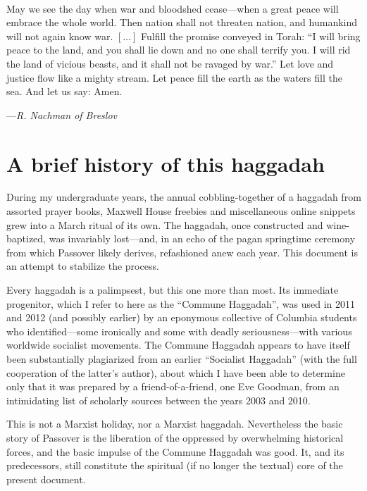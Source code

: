 \documentclass[a4paper,10pt,openany]{memoir}
\newcommand{\HgEllipsis}{\ensuremath{\left[\ldots\right]}}
\newcommand{\HgSource}[1]{\hfill{\small---\itshape{#1}}}
\newenvironment{HgEnglish}{\strut\\\noindent}{\vspace{1em}}
\begin{document}
\vfill

\begin{HgEnglish}
May we see the day when war and bloodshed cease---when a great peace will
embrace the whole world.  Then nation shall not threaten nation, and humankind
will not again know war. \HgEllipsis{}
Fulfill the promise conveyed in Torah: ``I will bring peace to the
land, and you shall lie down and no one shall terrify you.  I will rid the land
of vicious beasts, and it shall not be ravaged by war.'' Let love and justice
flow like a mighty stream.  Let peace fill the earth as the waters fill the sea.
And let us say: Amen. 

\HgSource{R. Nachman of Breslov}
\end{HgEnglish}

\vfill

\chapter*{A brief history of this haggadah}

During my undergraduate years, the annual cobbling-together of a haggadah from
assorted prayer books, Maxwell House freebies and miscellaneous online snippets
grew into a March ritual of its own. The haggadah, once constructed and
wine-baptized, was invariably lost---and, in an echo of the pagan springtime
ceremony from which Passover likely derives, refashioned anew each year.  This
document is an attempt to stabilize the process.

Every haggadah is a palimpsest, but this one more than most. Its immediate
progenitor, which I refer to here as the ``Commune Haggadah'', was used in 2011
and 2012 (and possibly earlier) by an eponymous collective of Columbia students
who identified---some ironically and some with deadly seriousness---with various
worldwide socialist movements. The Commune Haggadah appears to have itself been
substantially plagiarized from an earlier ``Socialist Haggadah'' (with the full
cooperation of the latter's author), about which I have been able to determine
only that it was prepared by a friend-of-a-friend, one Eve Goodman, from an
intimidating list of scholarly sources between the years 2003 and 2010.

This is not a Marxist holiday, nor a Marxist haggadah. Nevertheless the basic
story of Passover is the liberation of the oppressed by overwhelming
historical forces, and the basic impulse of the Commune Haggadah was good. It,
and its predecessors, still constitute the spiritual (if no longer the textual)
core of the present document. 
\end{document}
